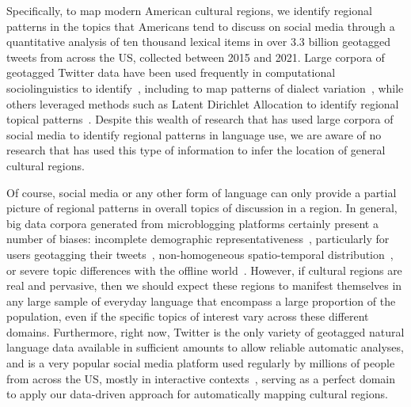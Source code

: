 \documentclass[../thesis.tex]{subfiles}
\begin{document}
Specifically, to map modern American cultural regions, we identify regional patterns in
the topics that Americans tend to discuss on social media through a quantitative
analysis of ten thousand lexical items in over 3.3 billion geotagged tweets from across
the US, collected between 2015 and 2021. Large corpora of geotagged Twitter data have
been used frequently in computational sociolinguistics to
identify~\cite{NguyenComputationalSociolinguistics2016}, including to map patterns of
dialect
variation~\cite{GrieveStatisticalMethod2011,EisensteinDiffusionLexical2014,GoncalvesCrowdsourcingDialect2014,HuangUnderstandingRegional2016,GrieveRegionalVariation2016,
DonosoDialectometricAnalysis2017,GoncalvesMappingAmericanization2018,AbitbolSocioeconomicDependencies2018,GrieveMappingLexical2019},
while others leveraged methods such as Latent Dirichlet Allocation to identify regional
topical patterns~\cite{KoyluUncoveringGeoSocial2018,FunknerGeographicalTopic2021}.
Despite this wealth of research that has used large corpora of social media to identify
regional patterns in language use, we are aware of no research that has used this type
of information to infer the location of general cultural regions.

Of course, social media or any other form of language can only provide a partial picture
of regional patterns in overall topics of discussion in a region. In general, big data
corpora generated from microblogging platforms certainly present a number of biases:
incomplete demographic representativeness~\cite{MisloveUnderstandingDemographics2011},
particularly for users geotagging their
tweets~\cite{PavalanathanConfoundsConsequences2015}, non-homogeneous spatio-temporal
distribution~\cite{steiger2015advanced}, or severe topic differences with the offline
world~\cite{diaz2016online}. However, if cultural regions are real and pervasive, then
we should expect these regions to manifest themselves in any large sample of everyday
language that encompass a large proportion of the population, even if the specific
topics of interest vary across these different domains. Furthermore, right now, Twitter
is the only variety of geotagged natural language data available in sufficient amounts
to allow reliable automatic analyses, and is a very popular social media platform used
regularly by millions of people from across the US, mostly in interactive
contexts~\cite{AuxierSocialMedia2021}, serving as a perfect domain to apply our
data-driven approach for automatically mapping cultural regions.
\end{document}
